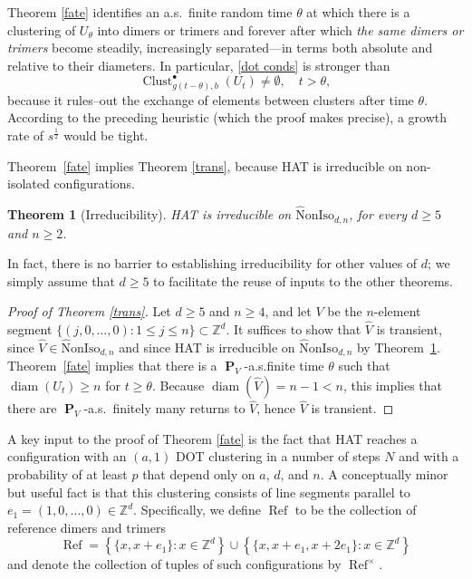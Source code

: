 \documentclass[11pt,reqno]{amsart}
\newtheorem{theorem}{Theorem}
\theoremstyle{definition}
\numberwithin{equation}{section}
\newcommand{\Z}{\mathbb{Z}}
\newcommand{\1}{\mathbf{1}}
\DeclareMathOperator{\PP}{\mathbf{P}}
\DeclareMathOperator{\diam}{diam}
\newcommand{\wtnoniso}{\mathrm{\wt{N}onIso}}
\newcommand{\wt}{\widehat}
\DeclareMathOperator{\Refcon}{\mathrm{Ref}}
\DeclareMathOperator{\Clust}{\mathrm{Clust}}
\begin{document}
Theorem \ref{fate} identifies an a.s.\ finite random time $\theta$ at which there is a clustering of $U_\theta$ into dimers or trimers and forever after which {\em the same dimers or trimers} become steadily, increasingly separated---in terms both absolute and relative to their diameters. In particular, \eqref{dot conds} is stronger than 
\[
\Clust_{g (t-\theta),b}^\bullet (U_t) \neq \emptyset, \quad t > \theta,
\]
because it rules--out the exchange of elements between clusters after time $\theta$. 
According to the preceding heuristic (which the proof makes precise), a growth rate of $s^{\frac12}$ would be tight.

Theorem~\ref{fate} implies Theorem \ref{trans}, because HAT is irreducible on non-isolated configurations.

\begin{theorem}[Irreducibility]\label{irred}
HAT is irreducible on $\wtnoniso_{d,n}$, for every $d \geq 5$ and $n \geq 2$.
\end{theorem}

In fact, there is no barrier to establishing irreducibility for other values of $d$; we simply assume that $d \geq 5$ to facilitate the reuse of inputs to the other theorems.

\begin{proof}[Proof of Theorem \ref{trans}]
Let $d \geq 5$ and $n \geq 4$, and let $V$ be the $n$-element segment $\{(j,0,\dots,0): 1 \leq j \leq n\} \subset \Z^d$. 
It suffices to show that $\wt V$ is transient, since $\wt V \in \wtnoniso_{d,n}$ and since HAT is irreducible on $\wtnoniso_{d,n}$ by Theorem~\ref{irred}. Theorem~\ref{fate} implies that there is a $\PP_V$-a.s.\@ finite time $\theta$ such that $\diam (U_t) \geq n$ for $t \geq \theta$. Because $\diam (\wt V) = n - 1 < n$, this implies that there are $\PP_V$-a.s.\ finitely many returns to $\wt V$, hence $\wt V$ is transient.
\end{proof}

A key input to the proof of Theorem \ref{fate} is the fact that HAT reaches a configuration with an $(a,1)$ DOT clustering in a number of steps $N$ and with a probability of at least $p$ that depend only on $a$, $d$, and $n$. A conceptually minor but useful fact is that this clustering consists of line segments parallel to $e_1 = (1,0,\dots,0) \in \Z^d$. Specifically, we define $\Refcon$ to be the collection of reference dimers and trimers
\[
\Refcon = \left\{ \{x,x+e_1\}: x \in \Z^d\right\} \cup \left\{\{x, x+e_1, x+2e_1\}: x \in \Z^d\right\}
\]
and denote the collection of tuples of such configurations by $\Refcon^\times$.
\end{document}
